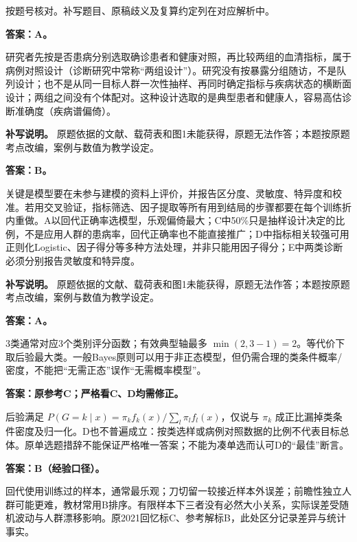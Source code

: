 \begin{keyidea}[核对方式]按题号核对。补写题目、原稿歧义及复算约定列在对应解析中。\end{keyidea}


\textbf{答案：A。}

研究者先按是否患病分别选取确诊患者和健康对照，再比较两组的血清指标，属于病例对照设计（诊断研究中常称``两组设计''）。研究没有按暴露分组随访，不是队列设计；也不是从同一目标人群一次性抽样、再同时确定指标与疾病状态的横断面设计；两组之间没有个体配对。这种设计选取的是典型患者和健康人，容易高估诊断准确度（疾病谱偏倚）。

\textbf{补写说明。} 原题依据的文献、载荷表和图1未能获得，原题无法作答；本题按原题考点改编，案例与数值为教学设定。



\textbf{答案：B。}

关键是模型要在未参与建模的资料上评价，并报告区分度、灵敏度、特异度和校准。若用交叉验证，指标筛选、因子提取等所有用到结局的步骤都要在每个训练折内重做。A以回代正确率选模型，乐观偏倚最大；C中50\%只是抽样设计决定的比例，不是应用人群的患病率，回代正确率也不能直接推广；D中指标相关较强可用正则化Logistic、因子得分等多种方法处理，并非只能用因子得分；E中两类诊断必须分别报告灵敏度和特异度。

\textbf{补写说明。} 原题依据的文献、载荷表和图1未能获得，原题无法作答；本题按原题考点改编，案例与数值为教学设定。



\textbf{答案：A。}

3类通常对应3个类别评分函数；有效典型轴最多 \(\min(2, 3-1)=2\)。等代价下取后验最大类。一般Bayes原则可以用于非正态模型，但仍需合理的类条件概率/密度，不能把``无需正态''误作``无需概率模型''。



\textbf{答案：原参考C；严格看C、D均需修正。}

后验满足 \(P(G=k\mid x)=\pi_k f_k(x)/\sum_l\pi_lf_l(x)\)，仅说与 \(\pi_k\) 成正比漏掉类条件密度及归一化。D也不普遍成立：按类选样或病例对照数据的比例不代表目标总体。原单选题措辞不能保证严格唯一答案；不能为凑单选而认可D的``最佳''断言。



\textbf{答案：B（经验口径）。}

回代使用训练过的样本，通常最乐观；刀切留一较接近样本外误差；前瞻性独立人群可能更难，教材常用B排序。有限样本下三者没有必然大小关系，实际误差受随机波动与人群漂移影响。原2021回忆标C、参考解标B，此处区分记录差异与统计事实。


